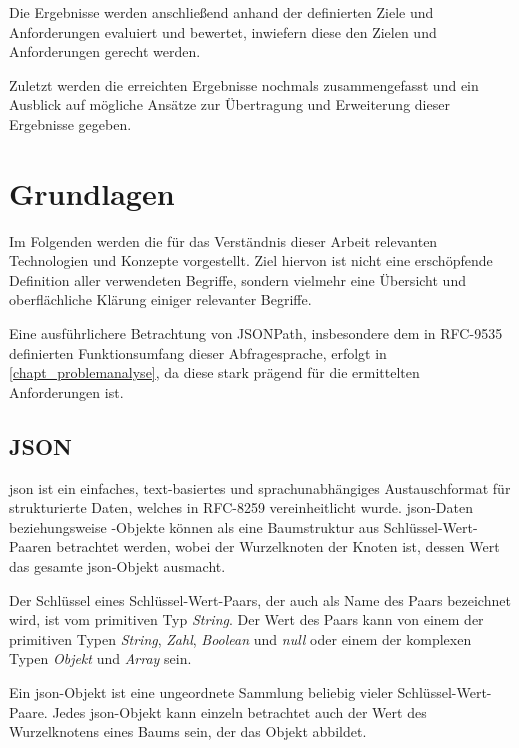 \documentclass[oneside]{ausarbeitung}
\begin{document}
	Die Ergebnisse werden anschließend anhand der definierten Ziele und Anforderungen evaluiert und bewertet, inwiefern diese den Zielen und Anforderungen gerecht werden.
	
	Zuletzt werden die erreichten Ergebnisse nochmals zusammengefasst und ein Ausblick auf mögliche Ansätze zur Übertragung und Erweiterung dieser Ergebnisse gegeben.
	
	
	
	
	
	\chapter{Grundlagen}
	\label{chapt_grundlagen}
	
	Im Folgenden werden die für das Verständnis dieser Arbeit relevanten Technologien und Konzepte vorgestellt. Ziel hiervon ist nicht eine erschöpfende Definition aller verwendeten Begriffe, sondern vielmehr eine Übersicht und oberflächliche Klärung einiger relevanter Begriffe.
	
	Eine ausführlichere Betrachtung von JSONPath, insbesondere dem in RFC-9535 definierten Funktionsumfang dieser Abfragesprache, erfolgt in \ref{chapt_problemanalyse}, da diese stark prägend für die ermittelten Anforderungen ist.
	
	
	
	\section{JSON}
	
	\ac{json} ist ein einfaches, text-basiertes und sprachunabhängiges Austauschformat für strukturierte Daten, welches in RFC-8259 vereinheitlicht wurde. \ac{json}-Daten beziehungsweise -Objekte können als eine Baumstruktur aus Schlüssel-Wert-Paaren betrachtet werden, wobei der Wurzelknoten der Knoten ist, dessen Wert das gesamte \ac{json}-Objekt ausmacht.
	
	Der Schlüssel eines Schlüssel-Wert-Paars, der auch als Name des Paars bezeichnet wird, ist vom primitiven Typ \textit{String}. Der Wert des Paars kann von einem der primitiven Typen \textit{String}, \textit{Zahl}, \textit{Boolean} und \textit{null} oder einem der komplexen Typen \textit{Objekt} und \textit{Array} sein.
	
	Ein \ac{json}-Objekt ist eine ungeordnete Sammlung beliebig vieler Schlüssel-Wert-Paare. Jedes \ac{json}-Objekt kann einzeln betrachtet auch der Wert des Wurzelknotens eines Baums sein, der das Objekt abbildet. 
	
\end{document}
